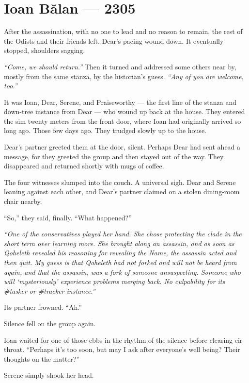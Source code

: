 \hypertarget{ioan-bux103lan-2305}{%
\chapter*{Ioan Bălan — 2305}\label{ioan-bux103lan-2305}}

After the assassination, with no one to lead and no reason to remain, the rest of the Odists and their friends left. Dear's pacing wound down. It eventually stopped, shoulders sagging.

\emph{``Come, we should return.''} Then it turned and addressed some others near by, mostly from the same stanza, by the historian's guess. \emph{``Any of you are welcome, too.''}

It was Ioan, Dear, Serene, and Praiseworthy — the first line of the stanza and down-tree instance from Dear — who wound up back at the house. They entered the sim twenty meters from the front door, where Ioan had originally arrived so long ago. Those few days ago. They trudged slowly up to the house.

Dear's partner greeted them at the door, silent. Perhaps Dear had sent ahead a message, for they greeted the group and then stayed out of the way. They disappeared and returned shortly with mugs of coffee.

The four witnesses slumped into the couch. A universal sigh. Dear and Serene leaning against each other, and Dear's partner claimed on a stolen dining-room chair nearby.

``So,'' they said, finally. ``What happened?''

\emph{``One of the conservatives played her hand. She chose protecting the clade in the short term over learning more. She brought along an assassin, and as soon as Qoheleth revealed his reasoning for revealing the Name, the assassin acted and then quit. My guess is that Qoheleth had not forked and will not be heard from again, and that the assassin, was a fork of someone unsuspecting. Someone who will `mysteriously' experience problems merging back. No culpability for its \#tasker or \#tracker instance.''}

Its partner frowned. ``Ah.''

Silence fell on the group again.

Ioan waited for one of those ebbs in the rhythm of the silence before clearing eir throat. ``Perhaps it's too soon, but may I ask after everyone's well being? Their thoughts on the matter?''

Serene simply shook her head.

